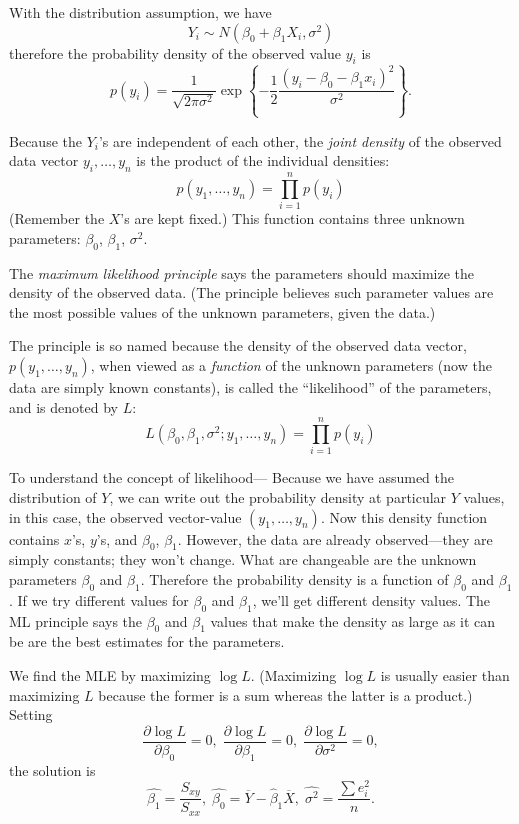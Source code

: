 \documentclass[12pt]{article}
\begin{document}
With the distribution assumption,
we have
\[
Y_i \sim N(\beta_0 + \beta_1 X_i, \sigma^2)
\]
therefore the probability density
of the observed value $y_i$ is
\[
p(y_i) = \frac{1}{\sqrt{2\pi \sigma^2}}
    \exp\left\{
        -\frac{1}{2}
        \frac{(y_i - \beta_0 - \beta_1 x_i)^2}{\sigma^2}
        \right\}
.
\]

Because the $Y_i$'s are independent of each other,
the \emph{joint density} of the observed data vector
$y_i, \dotsc, y_n$ is the product of the
individual densities:
\[
p(y_1,\dotsc, y_n) = \prod_{i=1}^n p(y_i)
\]
(Remember the $X$'s are kept fixed.)
This function contains three unknown parameters: $\beta_0$, $\beta_1$,
$\sigma^2$.

The \emph{maximum likelihood principle} says the parameters should
maximize the density of the observed data. (The principle believes such
parameter values are the most possible values of the unknown parameters,
given the data.)

The principle is so named because the density of the observed data
vector, $p(y_1,\dotsc,y_n)$,
when viewed as a \emph{function} of the unknown parameters
(now the data are simply known constants),
is called the ``likelihood'' of the parameters,
and is denoted by $L$:
\[
L(\beta_0, \beta_1, \sigma^2; y_1,\dotsc,y_n) = \prod_{i=1}^n p(y_i)
\]

To understand the concept of likelihood---%
Because we have assumed the distribution of $Y$,
we can write out the probability density at particular $Y$ values,
in this case, the observed vector-value $(y_1,\dotsc,y_n)$.
Now this density function contains $x$'s, $y$'s,
and $\beta_0$, $\beta_1$.
However, the data are already observed---they are simply constants;
they won't change.
What are changeable are the unknown parameters
$\beta_0$ and $\beta_1$.
Therefore the probability density is a function
of $\beta_0$ and $\beta_1$.
If we try different values for $\beta_0$ and $\beta_1$,
we'll get different density values.
The ML principle says the $\beta_0$ and $\beta_1$ values
that make the density as large as it can be
are the best estimates for the parameters.

We find the MLE by maximizing $\log L$.
(Maximizing $\log L$ is usually easier than maximizing $L$
because the former is a sum whereas the latter is a product.)
Setting
\[
\frac{\partial \log L}{\partial \beta_0} = 0,\;
\frac{\partial \log L}{\partial \beta_1} = 0,\;
\frac{\partial \log L}{\partial \sigma^2} = 0,
\]
the solution is
\[
\hat{\beta_1} = \frac{S_{xy}}{S_{xx}}, \;
\hat{\beta_0} = \overline{Y} - \hat{\beta}_1\overline{X}, \;
\hat{\sigma^2} = \frac{\sum e_i^2}{n}.
\]
\end{document}
